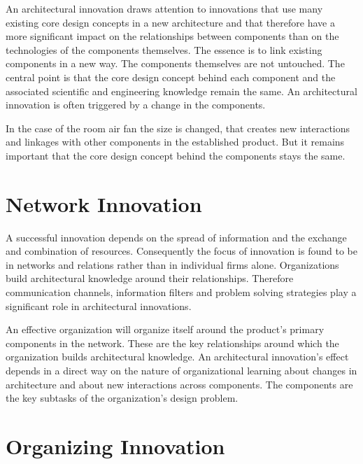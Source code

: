 An architectural innovation draws attention to innovations that use many existing core design concepts in a new architecture and that therefore have a more significant impact on the relationships between components than on the technologies of the components themselves. The essence is to link existing components in a new way. The components themselves are not untouched. The central point is that the core design concept behind each component and the associated scientific and engineering knowledge remain the same. An architectural innovation is often triggered by a change in the components.

In the case of the room air fan the size is changed, that creates new interactions and linkages with other components in the established product. But it remains important that the core design concept behind the components stays the same.


\section{Network Innovation}

A successful innovation depends on the spread of information and the exchange and combination of resources. Consequently the focus of innovation is found to be in networks and relations rather than in individual firms alone. Organizations build architectural knowledge around their relationships. Therefore communication channels, information filters and problem solving strategies play a significant role in architectural innovations.

An effective organization will organize itself around the product’s primary components in the network. These are the key relationships around which the organization builds architectural knowledge. An architectural innovation’s effect depends in a direct way on the nature of organizational learning about changes in architecture and about new interactions across components. The components are the key subtasks of the organization’s design problem.


\section{Organizing Innovation}


